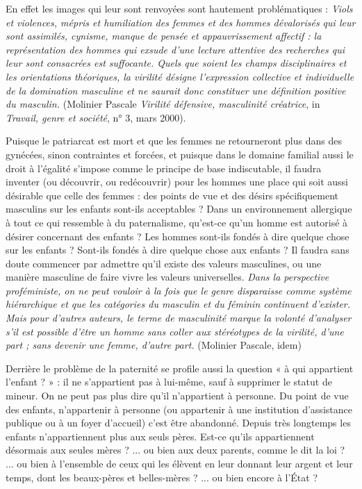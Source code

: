  En effet les images qui leur sont renvoyées sont hautement problématiques : 
 \emph{Viols et violences, mépris et humiliation des femmes et des hommes dévalorisés qui leur sont assimilés, cynisme, manque de pensée et appauvrissement affectif : la représentation des hommes qui exsude d'une lecture attentive des recherches qui leur sont consacrées est suffocante. Quels que soient les champs disciplinaires et les orientations théoriques, la virilité désigne l'expression collective et individuelle de la domination masculine et ne saurait donc constituer une définition positive du masculin.} (Molinier Pascale \emph{Virilité défensive, masculinité créatrice}, in  \emph{Travail, genre et société}, n° 3, mars 2000).



 Puisque le patriarcat est mort et que les femmes ne retourneront plus dans des gynécées, sinon contraintes et forcées, et puisque dans le domaine familial aussi le droit à l'égalité s'impose comme le principe de base indiscutable, il faudra inventer (ou découvrir, ou redécouvrir) pour les hommes une place qui soit aussi désirable que celle des femmes : des points de vue et des désirs spécifiquement masculins sur les enfants sont-ils acceptables ? Dans un environnement allergique à tout ce qui ressemble à du paternalisme, qu'est-ce qu'un homme est autorisé à désirer concernant des enfants ? Les hommes sont-ils fondés à dire quelque chose sur les enfants ? Sont-ils fondés à dire quelque chose aux enfants ? Il faudra sans doute commencer par admettre qu'il existe des valeurs masculines, ou une manière masculine de faire vivre les valeurs universelles. \emph{Dans la perspective proféministe, on ne peut vouloir à la fois que le genre disparaisse comme système hiérarchique et que les catégories du masculin et du féminin continuent d'exister. Mais pour d'autres auteurs, le terme de masculinité marque la volonté d'analyser s'il est possible d'être un homme sans coller aux stéréotypes de la virilité, d'une part ; sans devenir une femme, d'autre part.} (Molinier Pascale, idem)

 Derrière le problème de la paternité se profile aussi la question « à qui appartient l'enfant ? » : il ne s'appartient pas à lui-même, sauf à supprimer le statut de mineur. On ne peut pas plus dire qu'il n'appartient à personne. Du point de vue des enfants, n'appartenir à personne (ou appartenir à une institution d'assistance publique ou à un foyer d'accueil) c'est être abandonné. Depuis très longtemps les enfants n'appartiennent plus aux seuls pères. Est-ce qu'ils appartiennent désormais aux seules mères ? ... ou bien aux deux parents, comme le dit la loi ? ... ou bien à l'ensemble de ceux qui les élèvent en leur donnant leur argent et leur temps, dont les beaux-pères et belles-mères ? ... ou bien encore à l'État ?


